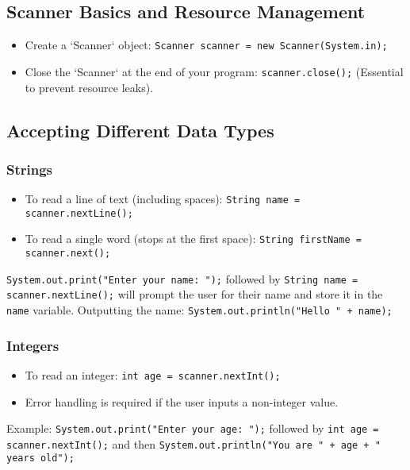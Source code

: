 \documentclass{article}
\begin{document}
\subsection{Scanner Basics and Resource Management}

\begin{itemize}
    \item Create a `Scanner` object:  \texttt{Scanner scanner = new Scanner(System.in);}
    \item Close the `Scanner` at the end of your program: \texttt{scanner.close();} (Essential to prevent resource leaks).
\end{itemize}

\subsection{Accepting Different Data Types}

\subsubsection{Strings}

\begin{itemize}
    \item To read a line of text (including spaces): \texttt{String name = scanner.nextLine(); }
    \item To read a single word (stops at the first space): \texttt{String firstName = scanner.next(); }
\end{itemize}

\texttt{System.out.print("Enter your name: ");}  followed by  \texttt{String name = scanner.nextLine();} will prompt the user for their name and store it in the \texttt{name} variable.  Outputting the name: \texttt{System.out.println("Hello " + name);}

\subsubsection{Integers}

\begin{itemize}
    \item To read an integer: \texttt{int age = scanner.nextInt(); }
    \item Error handling is required if the user inputs a non-integer value.
\end{itemize}

Example: \texttt{System.out.print("Enter your age: ");} followed by \texttt{int age = scanner.nextInt();} and then \texttt{System.out.println("You are " + age + " years old");}
\end{document}
